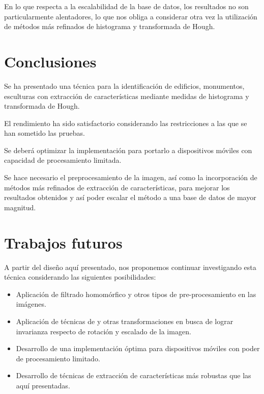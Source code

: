 \documentclass[conference,spanish,a4paper,10pt,oneside,final]{tfmpd}
\begin{document}
En lo que respecta a la escalabilidad de la base de datos, los resultados no
son particularmente alentadores, lo que nos obliga a considerar otra vez la
utilización de métodos más refinados de histograma y transformada de Hough.
%
%
%
%
\section{Conclusiones}
Se ha presentado una técnica para la identificación de edificios, monumentos,
esculturas con extracción de características mediante medidas de histograma
y transformada de Hough.

El rendimiento ha sido satisfactorio considerando las restricciones a las
que se han sometido las pruebas.

Se deberá optimizar la implementación para portarlo a dispositivos móviles
con capacidad de procesamiento limitada.

Se hace necesario el preprocesamiento de la imagen, así como la incorporación
de métodos más refinados de extracción de características, para mejorar los
resultados obtenidos y así poder escalar el método a una base de datos de
mayor magnitud.
%
%
%
%
\section{Trabajos futuros}
A partir del diseño aquí presentado, nos proponemos continuar
investigando esta técnica considerando las siguientes posibilidades:
\begin{itemize}
\item Aplicación de filtrado homomórfico y otros tipos de
      pre-procesamiento en las imágenes.
\item Aplicación de técnicas de  y otras transformaciones en busca
      de lograr invarianza respecto de rotación y escalado de la imagen.
\item Desarrollo de una implementación óptima para dispositivos móviles con
      poder de procesamiento limitado.
\item Desarrollo de técnicas de extracción de características más robustas que
      las aquí presentadas.
\end{itemize}
\nocite{*}


\end{document}
